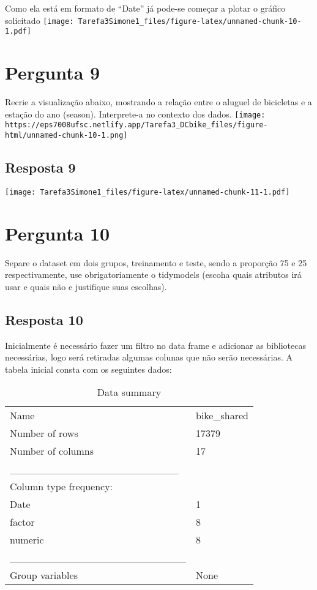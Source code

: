 \documentclass[
]{article}
\begin{document}
Como ela está em formato de ``Date'' já pode-se começar a plotar o
gráfico solicitado
\texttt{[image: Tarefa3Simone1\_files/figure-latex/unnamed-chunk-10-1.pdf]}

\hypertarget{pergunta-9}{%
\section{Pergunta 9}\label{pergunta-9}}

Recrie a visualização abaixo, mostrando a relação entre o aluguel de
bicicletas e a estação do ano (season). Interprete-a no contexto dos
dados.
\texttt{[image: https://eps7008ufsc.netlify.app/Tarefa3\_DCbike\_files/figure-html/unnamed-chunk-10-1.png]}

\hypertarget{resposta-9}{%
\subsection{Resposta 9}\label{resposta-9}}

\texttt{[image: Tarefa3Simone1\_files/figure-latex/unnamed-chunk-11-1.pdf]}

\hypertarget{pergunta-10}{%
\section{Pergunta 10}\label{pergunta-10}}

Separe o dataset em dois grupos, treinamento e teste, sendo a proporção
75 e 25 respectivamente, use obrigatoriamente o tidymodels (escoha quais
atributos irá usar e quais não e justifique suas escolhas).

\hypertarget{resposta-10}{%
\subsection{Resposta 10}\label{resposta-10}}

Inicialmente é necessário fazer um filtro no data frame e adicionar as
bibliotecas necessárias, logo será retiradas algumas colunas que não
serão necessárias. A tabela inicial consta com os seguintes dados:

\begin{longtable}[]{@{}ll@{}}
\caption{Data summary}\tabularnewline
\toprule()
\endhead
Name & bike\_shared \\
Number of rows & 17379 \\
Number of columns & 17 \\
\_\_\_\_\_\_\_\_\_\_\_\_\_\_\_\_\_\_\_\_\_\_\_ & \\
Column type frequency: & \\
Date & 1 \\
factor & 8 \\
numeric & 8 \\
\_\_\_\_\_\_\_\_\_\_\_\_\_\_\_\_\_\_\_\_\_\_\_\_ & \\
Group variables & None \\
\bottomrule()
\end{longtable}
\end{document}

